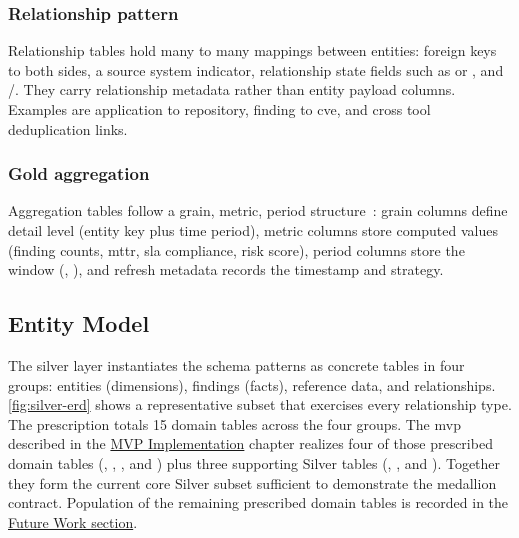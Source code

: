 \subsubsection{Relationship pattern}

Relationship tables hold many to many mappings between entities: foreign keys to both sides, a source system indicator, relationship state fields such as  or , and /. They carry relationship metadata rather than entity payload columns. Examples are application to repository, finding to \gls{cve}, and cross tool deduplication links.

\subsubsection{Gold aggregation}

Aggregation tables follow a grain, metric, period structure~\parencite{Kimball2013}: grain columns define detail level (entity key plus time period), metric columns store computed values (finding counts, \gls{mttr}, \gls{sla} compliance, risk score), period columns store the window (, ), and refresh metadata records the  timestamp and strategy.


\subsection{Entity Model}
\label{sec:entity-model}

The silver layer instantiates the schema patterns as concrete tables in four groups: entities (dimensions), findings (facts), reference data, and relationships. \autoref{fig:silver-erd} shows a representative subset that exercises every relationship type. The prescription totals 15 domain tables across the four groups. The \gls{mvp} described in the \hyperref[ch:implementation]{MVP Implementation} chapter realizes four of those prescribed domain tables (, , , and ) plus three supporting Silver tables (, , and ). Together they form the current core Silver subset sufficient to demonstrate the medallion contract. Population of the remaining prescribed domain tables is recorded in the \hyperref[sec:future-work]{Future Work section}.

